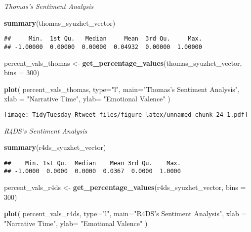 \documentclass[]{article}
\newenvironment{Shaded}{\begin{snugshade}}{\end{snugshade}}
\newcommand{\DataTypeTok}[1]{\textcolor[rgb]{0.13,0.29,0.53}{#1}}
\newcommand{\DecValTok}[1]{\textcolor[rgb]{0.00,0.00,0.81}{#1}}
\newcommand{\KeywordTok}[1]{\textcolor[rgb]{0.13,0.29,0.53}{\textbf{#1}}}
\newcommand{\NormalTok}[1]{#1}
\newcommand{\StringTok}[1]{\textcolor[rgb]{0.31,0.60,0.02}{#1}}
\begin{document}
\emph{Thomas's Sentiment Analysis}

\begin{Shaded}
\begin{Highlighting}[]
\KeywordTok{summary}\NormalTok{(thomas_syuzhet_vector)}
\end{Highlighting}
\end{Shaded}

\begin{verbatim}
##     Min.  1st Qu.   Median     Mean  3rd Qu.     Max. 
## -1.00000  0.00000  0.00000  0.04932  0.00000  1.00000
\end{verbatim}

\begin{Shaded}
\begin{Highlighting}[]
\NormalTok{percent_vals_thomas <-}\StringTok{ }\KeywordTok{get_percentage_values}\NormalTok{(thomas_syuzhet_vector, }\DataTypeTok{bins =} \DecValTok{300}\NormalTok{)}

\KeywordTok{plot}\NormalTok{(}
\NormalTok{  percent_vals_thomas, }
  \DataTypeTok{type=}\StringTok{"l"}\NormalTok{, }
  \DataTypeTok{main=}\StringTok{"Thomas's Sentiment Analysis"}\NormalTok{, }
  \DataTypeTok{xlab =} \StringTok{"Narrative Time"}\NormalTok{, }
  \DataTypeTok{ylab=} \StringTok{"Emotional Valence"}
\NormalTok{  )}
\end{Highlighting}
\end{Shaded}

\texttt{[image: TidyTuesday\_Rtweet\_files/figure-latex/unnamed-chunk-24-1.pdf]}

\emph{R4DS's Sentiment Analysis}

\begin{Shaded}
\begin{Highlighting}[]
\KeywordTok{summary}\NormalTok{(r4ds_syuzhet_vector)}
\end{Highlighting}
\end{Shaded}

\begin{verbatim}
##    Min. 1st Qu.  Median    Mean 3rd Qu.    Max. 
## -1.0000  0.0000  0.0000  0.0367  0.0000  1.0000
\end{verbatim}

\begin{Shaded}
\begin{Highlighting}[]
\NormalTok{percent_vals_r4ds <-}\StringTok{ }\KeywordTok{get_percentage_values}\NormalTok{(r4ds_syuzhet_vector, }\DataTypeTok{bins =} \DecValTok{300}\NormalTok{)}

\KeywordTok{plot}\NormalTok{(}
\NormalTok{  percent_vals_r4ds, }
  \DataTypeTok{type=}\StringTok{"l"}\NormalTok{, }
  \DataTypeTok{main=}\StringTok{"R4DS's Sentiment Analysis"}\NormalTok{, }
  \DataTypeTok{xlab =} \StringTok{"Narrative Time"}\NormalTok{, }
  \DataTypeTok{ylab=} \StringTok{"Emotional Valence"}
\NormalTok{  )}
\end{Highlighting}
\end{Shaded}
\end{document}
